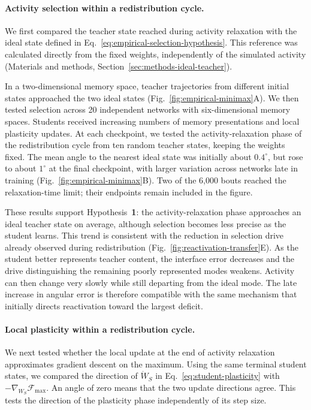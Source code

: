 \documentclass[10pt,letterpaper]{article}
\theoremstyle{plain}
\theoremstyle{remark}
\begin{document}
\paragraph{Activity selection within a redistribution cycle.}
We first compared the teacher state reached during activity relaxation with the ideal state defined in Eq.~\eqref{eq:empirical-selection-hypothesis}. This reference was calculated directly from the fixed weights, independently of the simulated activity (Materials and methods, Section~\ref{sec:methods-ideal-teacher}).

In a two-dimensional memory space, teacher trajectories from different initial states approached the two ideal states (Fig.~\ref{fig:empirical-minimax}A). We then tested selection across 20 independent networks with six-dimensional memory spaces. Students received increasing numbers of memory presentations and local plasticity updates. At each checkpoint, we tested the activity-relaxation phase of the redistribution cycle from ten random teacher states, keeping the weights fixed. The mean angle to the nearest ideal state was initially about \(0.4^\circ\), but rose to about \(1^\circ\) at the final checkpoint, with larger variation across networks late in training (Fig.~\ref{fig:empirical-minimax}B). Two of the 6,000 bouts reached the relaxation-time limit; their endpoints remain included in the figure.

These results support Hypothesis~\textbf{1}: the activity-relaxation phase approaches an ideal teacher state on average, although selection becomes less precise as the student learns. This trend is consistent with the reduction in selection drive already observed during redistribution (Fig.~\ref{fig:reactivation-transfer}E). As the student better represents teacher content, the interface error decreases and the drive distinguishing the remaining poorly represented modes weakens. Activity can then change very slowly while still departing from the ideal mode. The late increase in angular error is therefore compatible with the same mechanism that initially directs reactivation toward the largest deficit.

\paragraph{Local plasticity within a redistribution cycle.}
We next tested whether the local update at the end of activity relaxation approximates gradient descent on the maximum. Using the same terminal student states, we compared the direction of \(\dot W_S\) in Eq.~\eqref{eq:student-plasticity} with \(-\nabla_{W_S}\mathcal F_{\max}\). An angle of zero means that the two update directions agree. This tests the direction of the plasticity phase independently of its step size.
\end{document}
